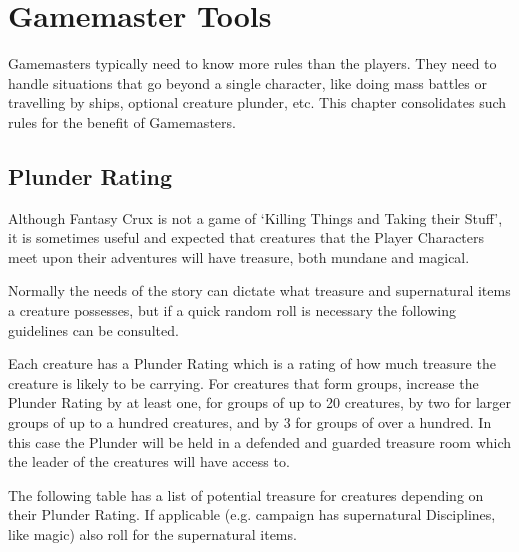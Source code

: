 \chapter{Gamemaster Tools}
\label{ch:more-rules-advice}

Gamemasters typically need to know more rules than the players. They need to handle situations that go beyond a single character, like doing mass battles or travelling by ships, optional creature plunder, etc. This chapter consolidates such rules for the benefit of Gamemasters.


\section{Plunder Rating}

Although Fantasy Crux is not a game of ‘Killing Things and Taking their Stuff’, it is sometimes useful and expected that creatures that the Player Characters meet upon their adventures will have treasure, both mundane and magical.

Normally the needs of the story can dictate what treasure and supernatural items a creature possesses, but if a quick random roll is necessary the following guidelines can be consulted.

Each creature has a Plunder Rating which is a rating of how much treasure the creature is likely to be carrying. For creatures that form groups, increase the Plunder Rating by at least one, for groups of up to 20 creatures, by two for larger groups of up to a hundred creatures, and by 3 for groups of over a hundred. In this case the Plunder will be held in a defended and guarded treasure room which the leader of the creatures will have access to.

The following table has a list of potential treasure for creatures depending on their Plunder Rating. If applicable (e.g. campaign has supernatural Disciplines, like magic) also roll for the supernatural items.


